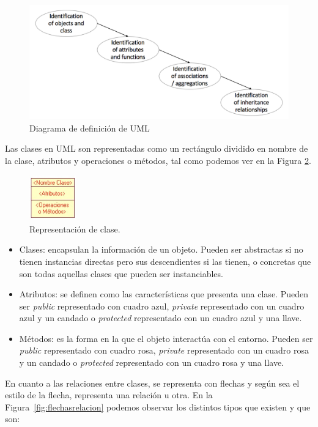 \documentclass[a4paper, 12pt]{book}
\begin{document}
\begin{figure}[htb]
  \centering
  \includegraphics[width=14cm, keepaspectratio]{img/construml}
  \caption{Diagrama de definición de UML}
  \label{fig:construml}
\end{figure}

Las clases en UML son representadas como un rectángulo dividido en nombre de la clase, atributos y operaciones o métodos, tal como podemos ver en la Figura \ref{fig:diagrama-de-clases}.

\begin{figure}[htb]
  \centering
  \includegraphics[width=2cm, keepaspectratio]{img/clase1}
  \caption{Representación de clase.}
  \label{fig:diagrama-de-clases}
\end{figure}

\begin{itemize}
  \item Clases: encapsulan la información de un objeto. Pueden ser abstractas si no tienen instancias directas pero sus descendientes si las tienen, o concretas que son todas aquellas clases que pueden ser instanciables.
  \item Atributos: se definen como las características que presenta una clase. Pueden ser \emph{public} representado con cuadro azul, \emph{private} representado con un cuadro azul y un candado o \emph{protected} representado con un cuadro azul y una llave.
  \item Métodos: es la forma en la que el objeto interactúa con el entorno. Pueden ser \emph{public} representado con cuadro rosa, \emph{private} representado con un cuadro rosa y un candado o \emph{protected} representado con un cuadro rosa y una llave.
\end{itemize}
En cuanto a las relaciones entre clases, se representa con flechas y según sea el estilo de la flecha, representa
una relación u otra. En la Figura~\ref{fig:flechasrelacion} podemos observar los distintos tipos que existen y que son:
\end{document}
